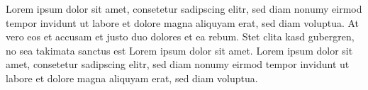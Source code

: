 Lorem ipsum dolor sit amet, consetetur sadipscing elitr, sed diam nonumy eirmod tempor invidunt ut labore et dolore magna aliquyam erat, sed diam voluptua. At vero eos et accusam et justo duo dolores et ea rebum. Stet clita kasd gubergren, no sea takimata sanctus est Lorem ipsum dolor sit amet. Lorem ipsum dolor sit amet, consetetur sadipscing elitr, sed diam nonumy eirmod tempor invidunt ut labore et dolore magna aliquyam erat, sed diam voluptua.
